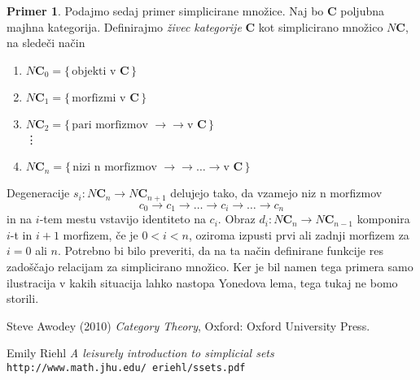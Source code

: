 \documentclass[12pt,a4paper]{book}
\theoremstyle{definition}
\theoremstyle{plain}
\theoremstyle{definition}
\newtheorem{primer}{Primer}[section]
\theoremstyle{remark}
\newcommand{\cat}[1]{\textbf{#1}}
\renewcommand{\set}[1]{\{\,#1\,\}}
\begin{document}
\begin{primer}
Podajmo sedaj primer simplicirane množice. Naj bo $\cat{C}$ poljubna majhna kategorija. Definirajmo \emph{živec kategorije} $\cat{C}$ kot simplicirano množico $N\cat{C}$, na sledeči način

\begin{enumerate}[label={}]
\item $N\cat{C}_0 = \set{\text{objekti v } \cat{C}}$
\item $N\cat{C}_1 = \set{\text{morfizmi v } \cat{C}}$
\item $N\cat{C}_2 = \set{\text{pari morfizmov } \rightarrow\rightarrow \text{v } \cat{C}}$ \\ %
\vdots
\item $N\cat{C}_n = \set{\text{nizi n morfizmov } \rightarrow\rightarrow\ldots\rightarrow \text{v } \cat{C}}$
\end{enumerate}
Degeneracije $s_i:N\cat{C}_n \to N\cat{C}_{n+1}$ delujejo tako, da vzamejo niz n morfizmov
$$ c_0 \rightarrow c_1 \rightarrow \ldots \rightarrow c_i \rightarrow \ldots \rightarrow c_n$$
in na $i$-tem mestu vstavijo identiteto na $c_i$. Obraz $d_i : N\cat{C}_n \to N\cat{C}_{n-1}$ komponira $i$-t in $i+1$ morfizem, če je $0 < i < n$, oziroma izpusti prvi ali zadnji morfizem za $i = 0$ ali $n$.
Potrebno bi bilo preveriti, da na ta način definirane funkcije res zadoščajo relacijam za simplicirano množico. Ker je bil namen tega primera samo ilustracija v kakih situacija lahko nastopa Yonedova lema, tega tukaj ne bomo storili.
\end{primer}

\begin{thebibliography}{9}

Steve Awodey (2010)
\textit{Category Theory},
Oxford: Oxford University Press.

Emily Riehl
\textit{A leisurely introduction to simplicial sets}
\\\texttt{http://www.math.jhu.edu/~eriehl/ssets.pdf}
\end{thebibliography}
\end{document}
